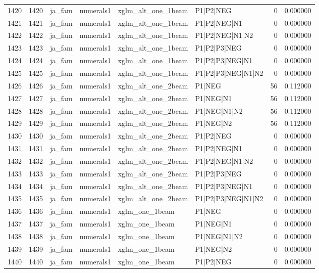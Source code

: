 \begin{tabular}{lrllllrr}
1420 & 1420 & ja_fam & numerals1 & xglm_alt_one_1beam & P1|P2|NEG & 0 & 0.000000 \\
1421 & 1421 & ja_fam & numerals1 & xglm_alt_one_1beam & P1|P2|NEG|N1 & 0 & 0.000000 \\
1422 & 1422 & ja_fam & numerals1 & xglm_alt_one_1beam & P1|P2|NEG|N1|N2 & 0 & 0.000000 \\
1423 & 1423 & ja_fam & numerals1 & xglm_alt_one_1beam & P1|P2|P3|NEG & 0 & 0.000000 \\
1424 & 1424 & ja_fam & numerals1 & xglm_alt_one_1beam & P1|P2|P3|NEG|N1 & 0 & 0.000000 \\
1425 & 1425 & ja_fam & numerals1 & xglm_alt_one_1beam & P1|P2|P3|NEG|N1|N2 & 0 & 0.000000 \\
1426 & 1426 & ja_fam & numerals1 & xglm_alt_one_2beam & P1|NEG & 56 & 0.112000 \\
1427 & 1427 & ja_fam & numerals1 & xglm_alt_one_2beam & P1|NEG|N1 & 56 & 0.112000 \\
1428 & 1428 & ja_fam & numerals1 & xglm_alt_one_2beam & P1|NEG|N1|N2 & 56 & 0.112000 \\
1429 & 1429 & ja_fam & numerals1 & xglm_alt_one_2beam & P1|NEG|N2 & 56 & 0.112000 \\
1430 & 1430 & ja_fam & numerals1 & xglm_alt_one_2beam & P1|P2|NEG & 0 & 0.000000 \\
1431 & 1431 & ja_fam & numerals1 & xglm_alt_one_2beam & P1|P2|NEG|N1 & 0 & 0.000000 \\
1432 & 1432 & ja_fam & numerals1 & xglm_alt_one_2beam & P1|P2|NEG|N1|N2 & 0 & 0.000000 \\
1433 & 1433 & ja_fam & numerals1 & xglm_alt_one_2beam & P1|P2|P3|NEG & 0 & 0.000000 \\
1434 & 1434 & ja_fam & numerals1 & xglm_alt_one_2beam & P1|P2|P3|NEG|N1 & 0 & 0.000000 \\
1435 & 1435 & ja_fam & numerals1 & xglm_alt_one_2beam & P1|P2|P3|NEG|N1|N2 & 0 & 0.000000 \\
1436 & 1436 & ja_fam & numerals1 & xglm_one_1beam & P1|NEG & 0 & 0.000000 \\
1437 & 1437 & ja_fam & numerals1 & xglm_one_1beam & P1|NEG|N1 & 0 & 0.000000 \\
1438 & 1438 & ja_fam & numerals1 & xglm_one_1beam & P1|NEG|N1|N2 & 0 & 0.000000 \\
1439 & 1439 & ja_fam & numerals1 & xglm_one_1beam & P1|NEG|N2 & 0 & 0.000000 \\
1440 & 1440 & ja_fam & numerals1 & xglm_one_1beam & P1|P2|NEG & 0 & 0.000000 \\

\end{tabular}
